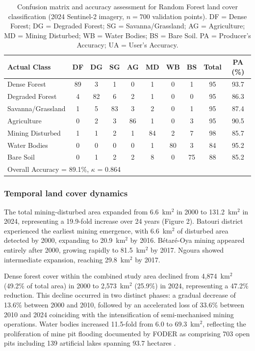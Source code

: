 \documentclass[preprint,12pt,authoryear]{elsarticle}
\begin{document}
\begin{table}[h!]
\centering
\caption{Confusion matrix and accuracy assessment for Random Forest land cover classification (2024 Sentinel-2 imagery, $n = 700$ validation points). DF = Dense Forest; DG = Degraded Forest; SG = Savanna/Grassland; AG = Agriculture; MD = Mining Disturbed; WB = Water Bodies; BS = Bare Soil. PA = Producer's Accuracy; UA = User's Accuracy.}
\label{tab:confusion}
\small
\begin{tabular}{lccccccccc}
\toprule
Actual Class & DF & DG & SG & AG & MD & WB & BS & Total & PA (\%) \\
\midrule
Dense Forest & 89 & 3 & 1 & 0 & 1 & 0 & 1 & 95 & 93.7 \\
Degraded Forest & 4 & 82 & 6 & 2 & 1 & 0 & 0 & 95 & 86.3 \\
Savanna/Grassland & 1 & 5 & 83 & 3 & 2 & 0 & 1 & 95 & 87.4 \\
Agriculture & 0 & 2 & 3 & 86 & 1 & 0 & 3 & 95 & 90.5 \\
Mining Disturbed & 1 & 1 & 2 & 1 & 84 & 2 & 7 & 98 & 85.7 \\
Water Bodies & 0 & 0 & 0 & 0 & 1 & 80 & 3 & 84 & 95.2 \\
Bare Soil & 0 & 1 & 2 & 2 & 8 & 0 & 75 & 88 & 85.2 \\
\midrule
\multicolumn{9}{l}{Overall Accuracy = 89.1\%, $\kappa$ = 0.864} \\
\bottomrule
\end{tabular}
\end{table}

\subsubsection{Temporal land cover dynamics}

The total mining-disturbed area expanded from 6.6~km$^{2}$ in 2000 to 131.2~km$^{2}$ in 2024, representing a 19.9-fold increase over 24 years (Figure 2). Batouri district experienced the earliest mining emergence, with 6.6~km$^{2}$ of disturbed area detected by 2000, expanding to 20.9~km$^{2}$ by 2016. B\'{e}tar\'{e}-Oya mining appeared entirely after 2000, growing rapidly to 81.5~km$^{2}$ by 2017. Ngoura showed intermediate expansion, reaching 29.8~km$^{2}$ by 2017.

Dense forest cover within the combined study area declined from 4,874~km$^{2}$ (49.2\% of total area) in 2000 to 2,573~km$^{2}$ (25.9\%) in 2024, representing a 47.2\% reduction. This decline occurred in two distinct phases: a gradual decrease of 13.6\% between 2000 and 2010, followed by an accelerated loss of 33.6\% between 2010 and 2024 coinciding with the intensification of semi-mechanised mining operations. Water bodies increased 11.5-fold from 6.0 to 69.3~km$^{2}$, reflecting the proliferation of mine pit flooding documented by FODER as comprising 703 open pits including 139 artificial lakes spanning 93.7 hectares \citep{FODER2022}.
\end{document}
